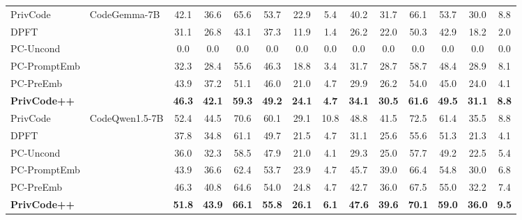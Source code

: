 \documentclass{article}
\theoremstyle{plain}
\theoremstyle{definition}
\theoremstyle{remark}
\def \toolname{PrivCode++}
\begin{document}
\begin{table}[!t]
{\begin{tabular}{l|l|cc|cc|cc|cc|cc|cc}
PrivCode
& \multirow{6}{*}{CodeGemma-7B}
& 42.1& 36.6& 65.6& 53.7& 22.9& 5.4& 40.2& 31.7& 66.1& 53.7& 30.0& 8.8
\\
\cline{3-14}
DPFT& & 31.1& 26.8& 43.1& 37.3& 11.9& 1.4& 26.2& 22.0& 50.3& 42.9& 18.2& 2.0\\
PC-Uncond
& & 0.0& 0.0& 0.0& 0.0
& 0.0& 0.0& 0.0& 0.0& 0.0& 0.0
& 0.0& 0.0\\
PC-PromptEmb& & 32.3&28.4&55.6&46.3&18.8&3.4&31.7&28.7&58.7&48.4&28.9& 8.1\\
PC-PreEmb& & 43.9 & 37.2 & 51.1 & 46.0 & 21.0 & 4.7 & 29.9 & 26.2 & 54.0 & 45.0 & 24.0 & 4.1 \\
\cellcolor{gray0}\textbf{\toolname}
& &
\cellcolor{gray0}\textbf{46.3}& \cellcolor{gray0}\textbf{42.1}& \cellcolor{gray0}\textbf{59.3}& \cellcolor{gray0}\textbf{49.2}
& \cellcolor{gray0}\textbf{24.1 }& 
\cellcolor{gray0}\textbf{4.7}& \cellcolor{gray0}\textbf{34.1}& \cellcolor{gray0}\textbf{30.5}& \cellcolor{gray0}\textbf{61.6}& \cellcolor{gray0}\textbf{49.5}
& \cellcolor{gray0}\textbf{31.1} & \cellcolor{gray0}\textbf{8.8}\\
\hline

PrivCode
& \multirow{6}{*}{CodeQwen1.5-7B}
& 52.4& 44.5& 70.6& 60.1& 29.1& 10.8& 48.8& 41.5& 72.5& 61.4& 35.5& 8.8 
\\
\cline{3-14}
DPFT& & 37.8& 34.8& 61.1& 49.7& 21.5& 4.7& 31.1& 25.6& 55.6& 51.3& 21.3& 4.1\\
PC-Uncond& & 36.0& 32.3& 58.5& 47.9
& 21.0& 4.1& 29.3& 25.0 & 57.7& 49.2
& 22.5& 5.4\\
PC-PromptEmb& &43.9&36.6&62.4&53.7&23.9&4.7&45.7&39.0&66.4&54.8&30.0&6.8 \\
PC-PreEmb& & 46.3 & 40.8 & 64.6 & 54.0 & 24.8&  4.7& 42.7 & 36.0 & 67.5 & 55.0 & 32.2&7.4\\
\cellcolor{gray0}\textbf{\toolname}
& 
& \cellcolor{gray0}\textbf{51.8}& \cellcolor{gray0}\textbf{43.9}& \cellcolor{gray0}\textbf{66.1}& \cellcolor{gray0}\textbf{55.8}& \cellcolor{gray0}\textbf{26.1} & \cellcolor{gray0}\textbf{6.1} 
& \cellcolor{gray0}\textbf{47.6}& \cellcolor{gray0}\textbf{39.6}& \cellcolor{gray0}\textbf{70.1} & \cellcolor{gray0}\textbf{59.0 }&\cellcolor{gray0}\textbf{36.0} & \cellcolor{gray0}\textbf{9.5} \\

\hline


\end{tabular}}
\end{table}
\end{document}
